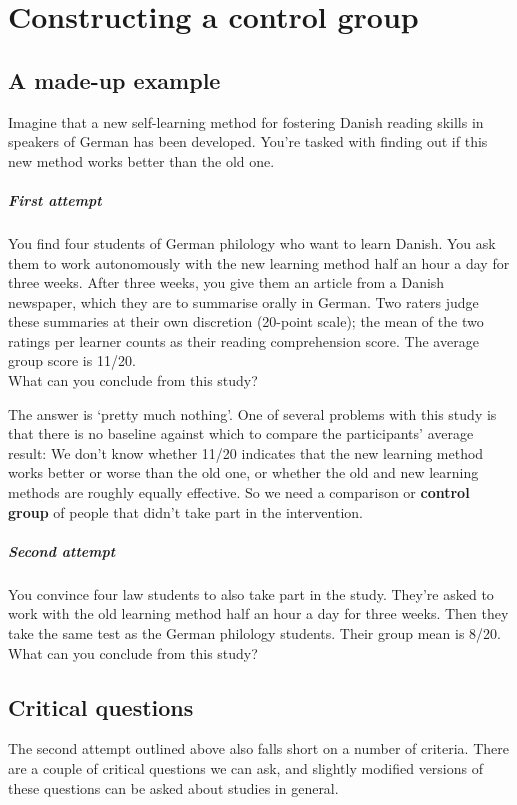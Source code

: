 \documentclass[a4paper]{tufte-book}\usepackage[]{graphicx}\usepackage[]{xcolor}
\newcommand{\term}[1]{\textbf{#1}}
\begin{document}
\chapter{Constructing a control group}\label{ch:randomisation}

\section{A made-up example}\label{sec:beispiel}
Imagine that a new self-learning method for fostering
Danish reading skills in speakers of German has been developed.
You're tasked with finding out if this new method works
better than the old one.

\paragraph{First attempt} 
You find four students of German philology
who want to learn Danish. You ask them to work
autonomously with the new learning method
half an hour a day for three weeks. After three weeks,
you give them an article from a Danish newspaper,
which they are to summarise orally in German.
Two raters judge these summaries at their own discretion
(20-point scale); the mean of the two ratings per
learner counts as their reading comprehension score.
The average group score is 11/20.\\
What can you conclude from this study?

The answer is `pretty much nothing'.
One of several problems with this study is that 
there is no baseline against which to compare the participants'
average result: We don't know whether 11/20 indicates that the
new learning method works better or worse than the old one, or whether
the old and new learning methods are roughly equally effective.
So we need a comparison or \term{control group}
of people that didn't take part in the intervention.

\paragraph{Second attempt}
You convince four law students to also take part in the study.
They're asked to work with the old learning method
half an hour a day for three weeks.
Then they take the same test as the German philology students.
Their group mean is 8/20.\\
What can you conclude from this study?

\clearpage

\section{Critical questions}\label{sec:validitaet}
The second attempt outlined above also falls short on a number of criteria.
There are a couple of critical questions we can ask, and slightly modified
versions of these questions can be asked about studies in general.
\end{document}
